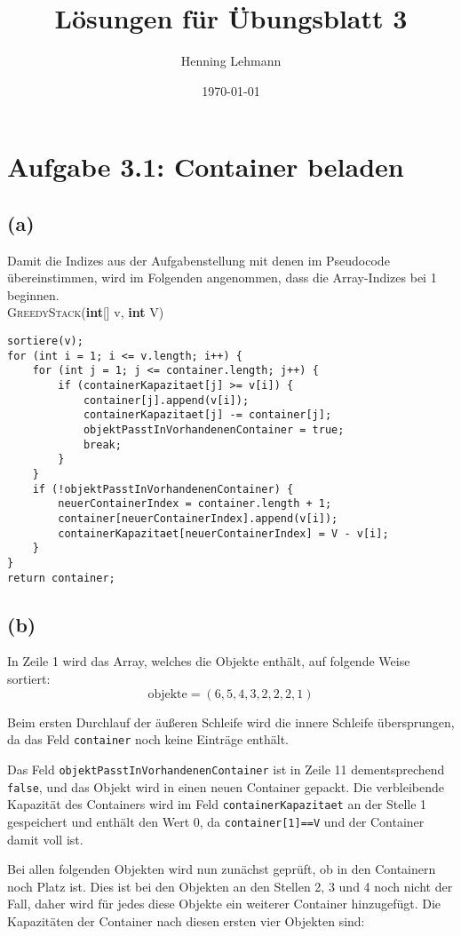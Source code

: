 \documentclass[a4paper,12pt]{article}
\title{Lösungen für Übungsblatt 3}
\author{Henning Lehmann}
\date{\today}
\begin{document}
\maketitle
\section*{Aufgabe 3.1: Container beladen}

\subsection*{(a)}
Damit die Indizes aus der Aufgabenstellung mit denen im Pseudocode übereinstimmen, wird im Folgenden angenommen, dass die Array-Indizes bei 1 beginnen. \\

\noindent\textsc{GreedyStack}(\textbf{int}[] v, \textbf{int} V)
\begin{lstlisting}
sortiere(v);
for (int i = 1; i <= v.length; i++) {
	for (int j = 1; j <= container.length; j++) {
		if (containerKapazitaet[j] >= v[i]) {
			container[j].append(v[i]);
			containerKapazitaet[j] -= container[j];
			objektPasstInVorhandenenContainer = true;
			break;
		}
	}
	if (!objektPasstInVorhandenenContainer) {
		neuerContainerIndex = container.length + 1;
		container[neuerContainerIndex].append(v[i]);
		containerKapazitaet[neuerContainerIndex] = V - v[i];
	}
}
return container;
\end{lstlisting}

\subsection*{(b)}
In Zeile 1 wird das Array, welches die Objekte enthält, auf folgende Weise sortiert: $$\text{objekte}=(6, 5, 4, 3, 2, 2, 2, 1)$$

Beim ersten Durchlauf der äußeren Schleife wird die innere Schleife übersprungen, da das Feld \verb|container| noch keine Einträge enthält.

Das Feld \verb|objektPasstInVorhandenenContainer| ist in Zeile 11 dementsprechend \verb|false|, und das Objekt wird in einen neuen Container gepackt. Die verbleibende Kapazität des Containers wird im Feld \verb|containerKapazitaet| an der Stelle 1 gespeichert und enthält den Wert 0, da \verb|container[1]==V| und der Container damit voll ist.

Bei allen folgenden Objekten wird nun zunächst geprüft, ob in den Containern noch Platz ist. Dies ist bei den Objekten an den Stellen 2, 3 und 4 noch nicht der Fall, daher wird für jedes diese Objekte ein weiterer Container hinzugefügt. Die Kapazitäten der Container nach diesen ersten vier Objekten sind:
\end{document}

